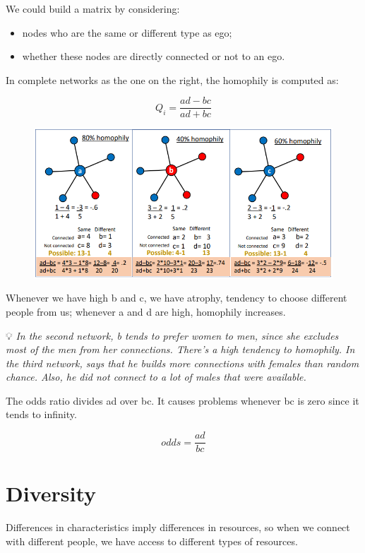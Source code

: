 \documentclass[
  notitlepage,
  onecolumn,
  openany]{book}
\providecommand{\tightlist}{%
  \setlength{\itemsep}{0pt}\setlength{\parskip}{0pt}}
\begin{document}
We could build a matrix by considering:

\begin{itemize}
\tightlist
\item
  nodes who are the same or different type as ego;
\item
  whether these nodes are directly connected or not to an ego.
\end{itemize}

In complete networks as the one on the right, the homophily is computed as:

\[
Q_i = \frac{ad-bc}{ad+bc}
\]

\begin{figure}[h!]

{\centering \includegraphics[width=0.8\linewidth]{images/06-Attributes based measures/Untitled 4} 

}

\end{figure}

Whenever we have high b and c, we have atrophy, tendency to choose different people from us; whenever a and d are high, homophily increases.

💡 \emph{In the second network, b tends to prefer women to men, since she excludes most of the men from her connections. There's a high tendency to homophily.
In the third network, says that he builds more connections with females than random chance. Also, he did not connect to a lot of males that were available.}

The odds ratio divides ad over bc. It causes problems whenever bc is zero since it tends to infinity.

\[
odds = \frac{ad}{bc}
\]

\hypertarget{diversity}{%
\section{Diversity}\label{diversity}}

Differences in characteristics imply differences in resources, so when we connect with different people, we have access to different types of resources.
\end{document}
